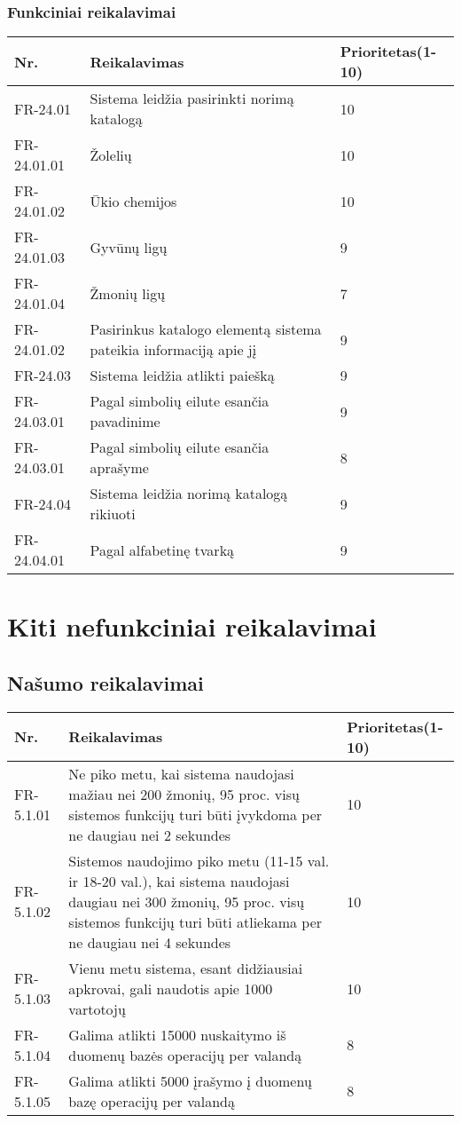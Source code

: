 \documentclass[oneside]{VUMIFPSkursinis}
\begin{document}
	\subsubsection{Funkciniai reikalavimai}
	\begin{table}[htbp]
		\begin{tabularx}{1\textwidth}{ |P{2.5cm}|X|P{3cm }| }  \hline
			Nr. & Reikalavimas & Prioritetas(1-10) \\ \hline
			FR-24.01 & Sistema leidžia pasirinkti norimą katalogą & 10 \\ \hline
			FR-24.01.01 & Žolelių & 10 \\ \hline
			FR-24.01.02 & Ūkio chemijos & 10 \\ \hline
			FR-24.01.03 & Gyvūnų ligų & 9 \\ \hline
			FR-24.01.04 & Žmonių ligų & 7 \\ \hline
			FR-24.01.02 & Pasirinkus katalogo elementą sistema pateikia informaciją apie jį & 9 \\ \hline
			FR-24.03 & Sistema leidžia atlikti paiešką  & 9 \\ \hline
			FR-24.03.01 & Pagal simbolių eilute esančia pavadinime & 9 \\ \hline
			FR-24.03.01 & Pagal simbolių eilute esančia aprašyme & 8 \\ \hline
			FR-24.04 & Sistema leidžia norimą katalogą rikiuoti & 9 \\ \hline
			FR-24.04.01 & Pagal alfabetinę tvarką  & 9 \\ \hline
		\end{tabularx}
	\end{table}

\section{Kiti nefunkciniai reikalavimai}
\subsection{Našumo reikalavimai}
\begin{table}[htbp]
	\begin{tabularx}{1\textwidth}{ |P{2.5cm}|X|P{3cm }| }  \hline
		Nr. & Reikalavimas & Prioritetas(1-10) \\ \hline
		FR-5.1.01 & Ne piko metu, kai sistema naudojasi mažiau nei 200 žmonių, 95 proc. visų sistemos funkcijų turi būti įvykdoma per ne daugiau nei 2 sekundes & 10 \\ \hline
		FR-5.1.02 & Sistemos naudojimo piko metu (11-15 val. ir 18-20 val.), kai sistema naudojasi daugiau nei 300 žmonių, 95 proc. visų sistemos funkcijų turi būti atliekama per ne daugiau nei 4 sekundes & 10 \\ \hline
		FR-5.1.03 & Vienu metu sistema, esant didžiausiai apkrovai, gali naudotis apie 1000 vartotojų & 10 \\ \hline
		FR-5.1.04 & Galima atlikti 15000 nuskaitymo iš duomenų bazės operacijų per valandą & 8 \\ \hline
		FR-5.1.05 & Galima atlikti 5000 įrašymo į duomenų bazę operacijų per valandą  & 8 \\ \hline
	\end{tabularx}
\end{table}
\end{document}
